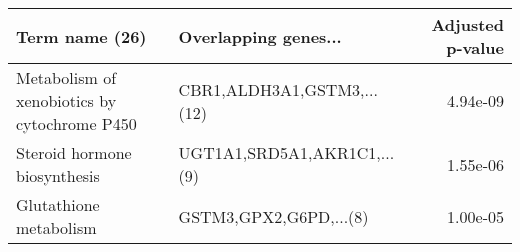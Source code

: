 \begin{tabular}{llr}
\toprule
                              Term name (26) &        Overlapping genes... &  Adjusted p-value \\
\midrule
Metabolism of xenobiotics by cytochrome P450 &  CBR1,ALDH3A1,GSTM3,...(12) &          4.94e-09 \\
                Steroid hormone biosynthesis & UGT1A1,SRD5A1,AKR1C1,...(9) &          1.55e-06 \\
                      Glutathione metabolism &      GSTM3,GPX2,G6PD,...(8) &          1.00e-05 \\
\bottomrule
\end{tabular}
